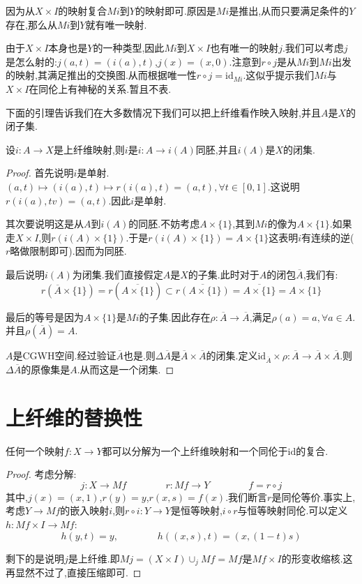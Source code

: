 因为从$X \times I$的映射复合$Mi$到$Y$的映射即可.原因是$Mi$是推出,从而只要满足条件的$Y$存在,那么从$Mi$到$Y$就有唯一映射.

由于$X \times I$本身也是$Y$的一种类型,因此$Mi$到$X \times I$也有唯一的映射$j$.我们可以考虑$j$是怎么射的:$j(a,t)=(i(a),t)$,$j(x)=(x,0)$.注意到$r \circ j$是从$Mi$到$Mi$出发的映射,其满足推出的交换图.从而根据唯一性$r \circ j=\mathrm{id}_{Mi}$.这似乎提示我们$Mi$与$X \times I$在同伦上有神秘的关系.暂且不表.

下面的引理告诉我们在大多数情况下我们可以把上纤维看作映入映射,并且$A$是$X$的闭子集.
\begin{lemma}
    设$i:A \to X$是上纤维映射,则$i$是$i:A \to i(A)$同胚,并且$i(A)$是$X$的闭集.
\end{lemma}
\begin{proof}
    首先说明$i$是单射.$(a,t) \mapsto (i(a),t) \mapsto r(i(a),t) =(a,t), \forall t \in [0,1]$.这说明$r(i(a),tv)=(a,t)$.因此$i$是单射.

    其次要说明这是从$A$到$i(A)$的同胚.不妨考虑$A \times \{1\}$,其到$Mi$的像为$A \times \{1\}$.如果走$X \times I$,则$r(i(A)\times \{1\})$.于是$r(i(A)\times \{1\})=A \times \{1\}$这表明$i$有连续的逆($r$略做限制即可).因而为同胚.

    最后说明$i(A)$为闭集.我们直接假定$A$是$X$的子集.此时对于$A$的闭包$\overline{A}$,我们有:
    $$
    r(\overline{A}\times \{1\})=r(\overline{A\times \{1\}})\subset \overline{r(A \times \{1\})}=\overline{A \times \{1\}}=A \times \{1\}
    $$

    最后的等号是因为$A \times \{1\}$是$Mi$的子集.因此存在$\rho:\overline{A}\to \overline{A}$,满足$\rho(a)=a,\forall a \in A$.并且$\rho(\overline{A})=A$.

    $A$是CGWH空间.经过验证$\overline{A}$也是.则$\Delta \overline{A}$是$\overline{A} \times \overline{A}$的闭集.定义$\mathrm{id}_{\overline{A}} \times \rho:\overline{A} \to \overline{A}\times \overline{A}$.则$\Delta \overline{A}$的原像集是$A$.从而这是一个闭集.
\end{proof}
\section{上纤维的替换性}
\begin{theorem}
    任何一个映射$f:X \to Y$都可以分解为一个上纤维映射和一个同伦于$\mathrm{id}$的复合.
\end{theorem}
\begin{proof}
    考虑分解:
    $$
    j:X \to Mf   \qquad \qquad r:Mf \to Y \qquad \qquad f=r \circ j
    $$
    其中,$j(x)=(x,1)$,$r(y)=y$,$r(x,s)=f(x)$.我们断言$r$是同伦等价.事实上,考虑$Y \to Mf$的嵌入映射$i$,则$r \circ i:Y \to Y$是恒等映射,$i \circ r$与恒等映射同伦.可以定义$h:Mf \times I \to Mf$:
    $$
    h(y,t)=y, \qquad \qquad h((x,s),t)=(x,(1-t)s)
    $$

    剩下的是说明$j$是上纤维.即$Mj=(X \times I)\cup_j Mf=Mf$是$Mf \times I$的形变收缩核.这再显然不过了,直接压缩即可.
\end{proof}
